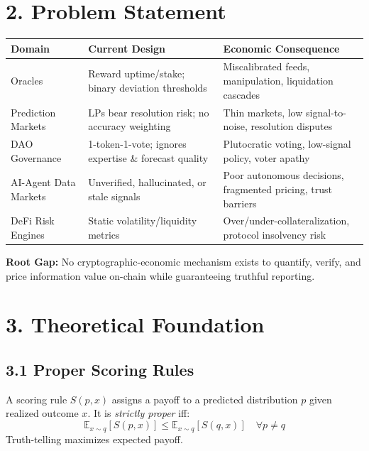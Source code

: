 \documentclass[11pt,a4paper]{article}
\begin{document}
\section*{2. Problem Statement}
\begin{center}
\begin{tabularx}{\textwidth}{@{}lXX@{}}
\toprule
\textbf{Domain} & \textbf{Current Design} & \textbf{Economic Consequence} \\
\midrule
Oracles & Reward uptime/stake; binary deviation thresholds & Miscalibrated feeds, manipulation, liquidation cascades \\
Prediction Markets & LPs bear resolution risk; no accuracy weighting & Thin markets, low signal-to-noise, resolution disputes \\
DAO Governance & 1-token-1-vote; ignores expertise \& forecast quality & Plutocratic voting, low-signal policy, voter apathy \\
AI-Agent Data Markets & Unverified, hallucinated, or stale signals & Poor autonomous decisions, fragmented pricing, trust barriers \\
DeFi Risk Engines & Static volatility/liquidity metrics & Over/under-collateralization, protocol insolvency risk \\
\bottomrule
\end{tabularx}
\end{center}
\noindent \textbf{Root Gap:} No cryptographic-economic mechanism exists to quantify, verify, and price information value on-chain while guaranteeing truthful reporting.

\section*{3. Theoretical Foundation}
\subsection*{3.1 Proper Scoring Rules}
A scoring rule $S(p, x)$ assigns a payoff to a predicted distribution $p$ given realized outcome $x$. It is \emph{strictly proper} iff:
\begin{equation}
\mathbb{E}_{x \sim q}[S(p, x)] \leq \mathbb{E}_{x \sim q}[S(q, x)] \quad \forall p \neq q
\end{equation}
Truth-telling maximizes expected payoff.
\end{document}
